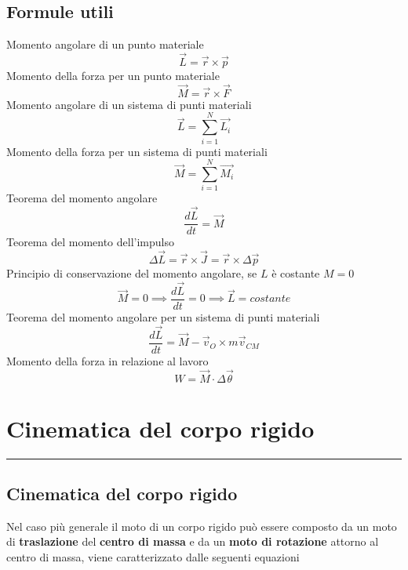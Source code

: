 \documentclass[twoside]{article}
\begin{document}
\subsection{Formule utili}
Momento angolare di un punto materiale
\begin{equation*}
  \boxed{\vec{L} = \vec{r} \times \vec{p}}
\end{equation*}
Momento della forza per un punto materiale
\begin{equation*}
  \boxed{\vec{M} = \vec{r} \times \vec{F}}
\end{equation*}
Momento angolare di un sistema di punti materiali
\begin{equation*}
  \boxed{\vec{L} = \sum_{i=1}^{N} \vec{L_i}}
\end{equation*}
Momento della forza per un sistema di punti materiali
\begin{equation*}
  \boxed{\vec{M} = \sum_{i=1}^{N} \vec{M_i}}
\end{equation*}
Teorema del momento angolare
\begin{equation*}
  \boxed{\frac{d\vec{L}}{dt} = \vec{M}}
\end{equation*}
Teorema del momento dell'impulso
\begin{equation*}
  \boxed{ \Delta \vec{L} = \vec{r} \times \vec{J} = \vec{r} \times \Delta \vec{p}}
\end{equation*}
Principio di conservazione del momento angolare, se $L$ è costante $M = 0$
\begin{equation*}
  \boxed{\vec{M} = 0 \implies \frac{d\vec{L}}{dt} = 0 \implies \vec{L} = costante}
\end{equation*}
Teorema del momento angolare per un sistema di punti materiali
\begin{equation*}
  \boxed{\frac{d\vec{L}}{dt} = \vec{M} - \vec{v}_O \times m \vec{v}_{CM}}
\end{equation*}
Momento della forza in relazione al lavoro
\begin{equation*}
  \boxed{W = \vec{M} \cdot \Delta \vec{\theta}}
\end{equation*}
\newpage
\hrulefill
\section{Cinematica del corpo rigido}
\rule{\linewidth/2}{0.5pt}
\subsection{Cinematica del corpo rigido}
Nel caso più generale il moto di un corpo rigido può essere composto da un moto di \textbf{traslazione} del \textbf{centro di massa} e da un \textbf{moto di rotazione} attorno al centro di massa, viene caratterizzato dalle seguenti equazioni\\
\end{document}
